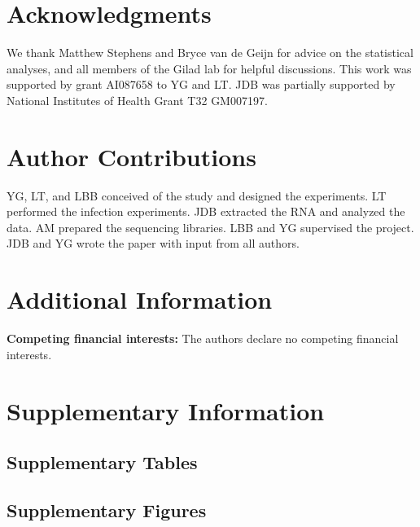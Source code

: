 \section{Acknowledgments}\label{acknowledgments}

We thank Matthew Stephens and Bryce van de Geijn for advice on the
statistical analyses, and all members of the Gilad lab for helpful
discussions. This work was supported by grant AI087658 to YG and LT. JDB
was partially supported by National Institutes of Health Grant T32
GM007197.

\section{Author Contributions}\label{author-contributions}

YG, LT, and LBB conceived of the study and designed the experiments. LT
performed the infection experiments. JDB extracted the RNA and analyzed
the data. AM prepared the sequencing libraries. LBB and YG supervised
the project. JDB and YG wrote the paper with input from all authors.

\section{Additional Information}\label{additional-information}

\textbf{Competing financial interests:} The authors declare no competing
financial interests.

\section{Supplementary Information}\label{supplementary-information}

\subsection{Supplementary Tables}\label{supplementary-tables}

\clearpage
\subsection{Supplementary Figures}\label{supplementary-figures}

